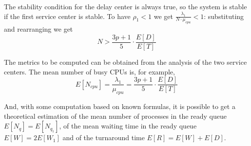 The stability condition for the delay center is always true, so the system is stable if the first service center is stable.
To have $\rho_1<1$ we get $\frac{\lambda_1}{N\cdot \mu_{cpu}}<1$: substituting and rearranging we get
\begin{equation}
    N > \frac{3p+1}{5}\cdot \frac{E[D]}{E[T]} 
\end{equation}

The metrics to be computed can be obtained from the analysis of the two
service centers. The mean number of busy CPUs is, for example,
\begin{equation}
    E[N_{cpu}]=\frac{\lambda_1}{\mu_{cpu}}=\frac{3p+1}{5}\cdot \frac{E[D]}{E[T]}
\end{equation}

And, with some computation based on known formulas, it is possible to get a theoretical estimation of
the mean number of processes in the ready queue $E[N_q]=E[N_{q_1}]$, of the mean
waiting time in the ready queue $E[W] = 2E[W_1]$ and of the turnaround
time $E[R] = E[W]+E[D]$.
